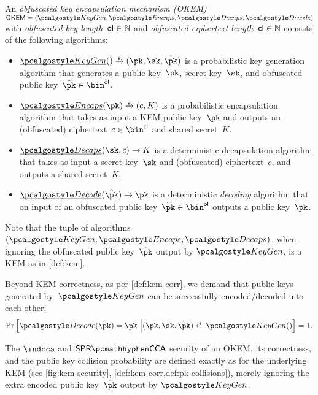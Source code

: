 \begin{definition}
    \label{def:okem}
    An \emph{obfuscated key encapsulation mechanism (OKEM)} $\OKEM = (\kgen, \encaps, \decaps, \decode)$ with \emph{obfuscated key length}~$\mathsf{ol} \in \mathbb{N}$ and \emph{obfuscated ciphertext length}~$\mathsf{cl} \in \mathbb{N}$ consists of the following algorithms:
    \begin{itemize}
        \item $\ul{\kgen}() \tor (\pk,\sk,\pkobf)$ is a probabilistic key generation algorithm that generates a public key~$\pk$, secret key~$\sk$, and obfuscated public key~$\pkobf \in \bin^\obfpklen$.

        \item $\ul{\encaps}(\pk) \tor (c, K)$ is a probabilistic encapsulation algorithm that takes as input a KEM public key~$\pk$ and outputs an (obfuscated) ciphertext~$c \in \bin^\obfctxtlen$ and shared secret~$K$.

        \item $\ul{\decaps}(\sk,c) \to K$ is a deterministic decapsulation algorithm that takes as input a secret key~$\sk$ and (obfuscated) ciphertext~$c$, and outputs a shared secret~$K$.
    
        \item $\ul{\decode}(\pkobf) \to \pk$
        is a deterministic \emph{decoding} algorithm that on input of an obfuscated public key~$\pkobf \in \bin^{\obfpklen}$ outputs a public key~$\pk$.
    \end{itemize}
    Note that the tuple of algorithms $(\kgen, \encaps, \decaps)$, when ignoring the obfuscated public key~$\pkobf$ output by $\kgen$, is a KEM as in \cref{def:kem}.

    Beyond KEM correctness, as per \cref{def:kem-corr}, we demand that public keys generated by~$\kgen$ can be successfully encoded/decoded into each other:
    \begin{align*}
        \Pr\left[
            \decode(\pkobf) = \pk
        ~\middle|
            (\pk, \sk, \pkobf) \getsr \kgen()
        \right] = 1.
    \end{align*}

\end{definition}

The $\indcca$ and $\sprcca$ security of an OKEM, its correctness, and the public key collision probability are defined exactly as for the underlying KEM (see \cref{fig:kem-security}, \cref{def:kem-corr,def:pk-collisions}), merely ignoring the extra encoded public key~$\pkobf$ output by $\kgen$.

